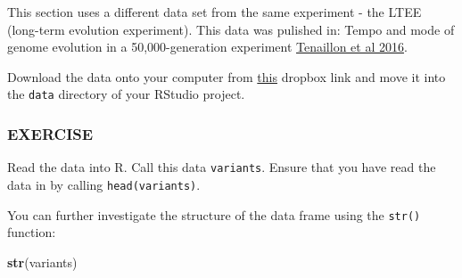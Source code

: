 \documentclass[]{book}
\newenvironment{Shaded}{\begin{snugshade}}{\end{snugshade}}
\newcommand{\KeywordTok}[1]{\textcolor[rgb]{0.13,0.29,0.53}{\textbf{#1}}}
\newcommand{\NormalTok}[1]{#1}
\begin{document}
This section uses a different data set from the same experiment - the LTEE (long-term evolution experiment). This data was pulished in: Tempo and mode of genome evolution in a 50,000-generation experiment \href{https://www.ncbi.nlm.nih.gov/pmc/articles/PMC4988878/}{Tenaillon et al 2016}.

Download the data onto your computer from \href{https://www.dropbox.com/s/1z7qrbke9l6o6ee/combined_tidy_vcf.csv?dl=0}{this} dropbox link and move it into the \texttt{data} directory of your RStudio project.

\hypertarget{exercise-21}{%
\subsubsection*{EXERCISE}\label{exercise-21}}

Read the data into R. Call this data \texttt{variants}. Ensure that you have read the data in by calling \texttt{head(variants)}.

You can further investigate the structure of the data frame using the \texttt{str()} function:

\begin{Shaded}
\begin{Highlighting}[]
\KeywordTok{str}\NormalTok{(variants)}
\end{Highlighting}
\end{Shaded}
\end{document}
